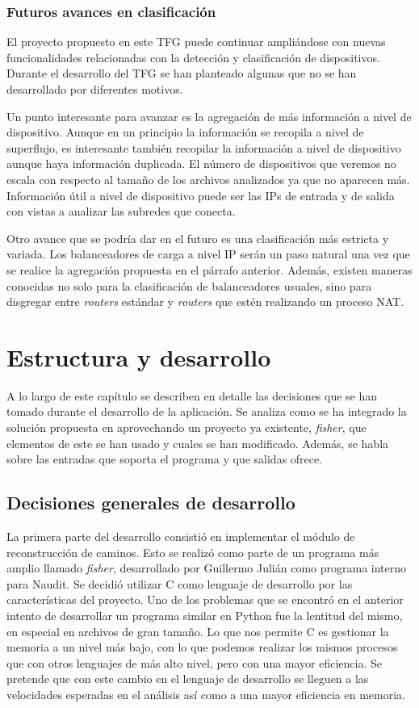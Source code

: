 \documentclass[tfg,epsbased,lof,lot,loa,final,nocopyright,overleaf]{tfgtfmthesisuam}
\begin{document}
\subsection{Futuros avances en clasificación}
\label{subsec:Analisis:Dispositivos:Futuro}
El proyecto propuesto en este TFG puede continuar ampliándose con nuevas funcionalidades relacionadas con la detección y clasificación de dispositivos. Durante el desarrollo del TFG se han planteado algunas que no se han desarrollado por diferentes motivos.

Un punto interesante para avanzar es la agregación de más información a nivel de dispositivo. Aunque en un principio la información se recopila a nivel de superflujo, es interesante también recopilar la información a nivel de dispositivo aunque haya información duplicada. El número de dispositivos que veremos no escala con respecto al tamaño de los archivos analizados ya que no aparecen más. Información útil a nivel de dispositivo puede ser las IPs de entrada y de salida con vistas a analizar las subredes que conecta.

Otro avance que se podría dar en el futuro es una clasificación más estricta y variada. Los balanceadores de carga a nivel IP serán un paso natural una vez que se realice la agregación propuesta en el párrafo anterior. Además, existen maneras conocidas no solo para la clasificación de balanceadores usuales, sino para disgregar entre \textit{routers} estándar y \textit{routers} que estén realizando un proceso NAT.

\chapter{Estructura y desarrollo}
\label{chap:Desarrollo}
A lo largo de este capítulo se describen en detalle las decisiones que se han tomado durante el desarrollo de la aplicación. Se analiza como se ha integrado la solución propuesta en aprovechando un proyecto ya existente, \textit{fisher}, que elementos de este se han usado y cuales se han modificado. Además, se habla sobre las entradas que soporta el programa y que salidas ofrece.

\section{Decisiones generales de desarrollo}
La primera parte del desarrollo consistió en implementar el módulo de reconstrucción de caminos. Esto se realizó como parte de un programa más amplio llamado \textit{fisher}, desarrollado por Guillermo Julián como programa interno para Naudit. Se decidió utilizar C como lenguaje de desarrollo por las características del proyecto. Uno de los problemas que se encontró en el anterior intento de desarrollar un programa similar en Python fue la lentitud del mismo, en especial en archivos de gran tamaño. Lo que nos permite C es gestionar la memoria a un nivel más bajo, con lo que podemos realizar los mismos procesos que con otros lenguajes de más alto nivel, pero con una mayor eficiencia. Se pretende que con este cambio en el lenguaje de desarrollo se lleguen a las velocidades esperadas en el análisis así como a una mayor eficiencia en memoria.
\end{document}
